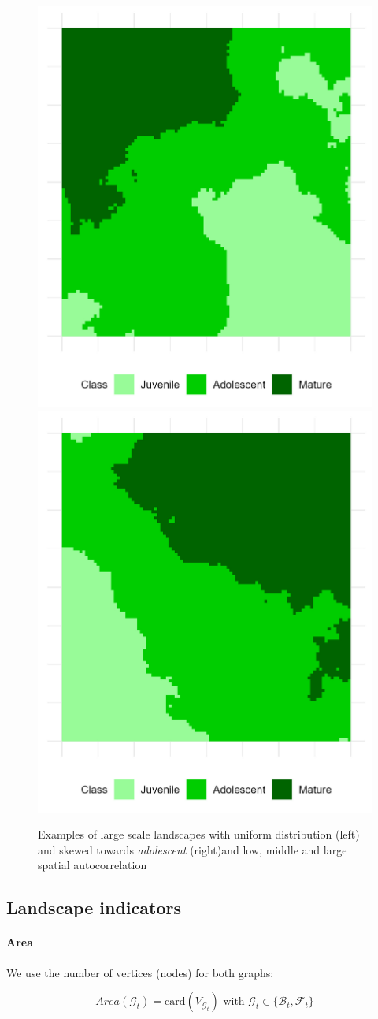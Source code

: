 \begin{figure}[H]
    \includegraphics[width=0.4\linewidth]{figures/wildland/large_land_autocorr_1.8_distrib_1}
    \includegraphics[width=0.4\linewidth]{figures/wildland/large_land_autocorr_1.8_distrib_4}
    \caption{Examples of large scale landscapes with uniform distribution (left) and skewed towards \textit{adolescent} (right)and low, middle and large spatial autocorrelation}
    \label{fig:ex_nlm}
\end{figure}
\clearpage





\subsection{Landscape indicators}
\label{sec:appendix_wildland__indicators}

\paragraph{Area}
We use the number of vertices (nodes) for both graphs:

\begin{equation}
Area(\mathcal{G}_t) = \mathrm{card}(V_{\mathcal{G}_t}) \text{ with } \mathcal{G}_t\in\{\mathcal{B}_t,\mathcal{F}_t\}
\label{eq:area}
\end{equation}

